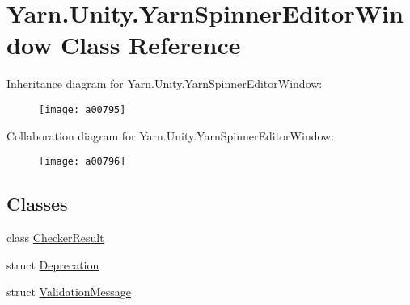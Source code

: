 \hypertarget{a00188}{\section{Yarn.\-Unity.\-Yarn\-Spinner\-Editor\-Window Class Reference}
\label{a00188}
}


Inheritance diagram for Yarn.\-Unity.\-Yarn\-Spinner\-Editor\-Window\-:
\nopagebreak
\begin{figure}[H]
\begin{center}
\leavevmode
\texttt{[image: a00795]}
\end{center}
\end{figure}


Collaboration diagram for Yarn.\-Unity.\-Yarn\-Spinner\-Editor\-Window\-:
\nopagebreak
\begin{figure}[H]
\begin{center}
\leavevmode
\texttt{[image: a00796]}
\end{center}
\end{figure}
\subsection*{Classes}
\begin{DoxyCompactItemize}
\item 
class \hyperlink{a00051}{Checker\-Result}
\item 
struct \hyperlink{a00092}{Deprecation}
\item 
struct \hyperlink{a00188_a00386}{Validation\-Message}
\end{DoxyCompactItemize}
